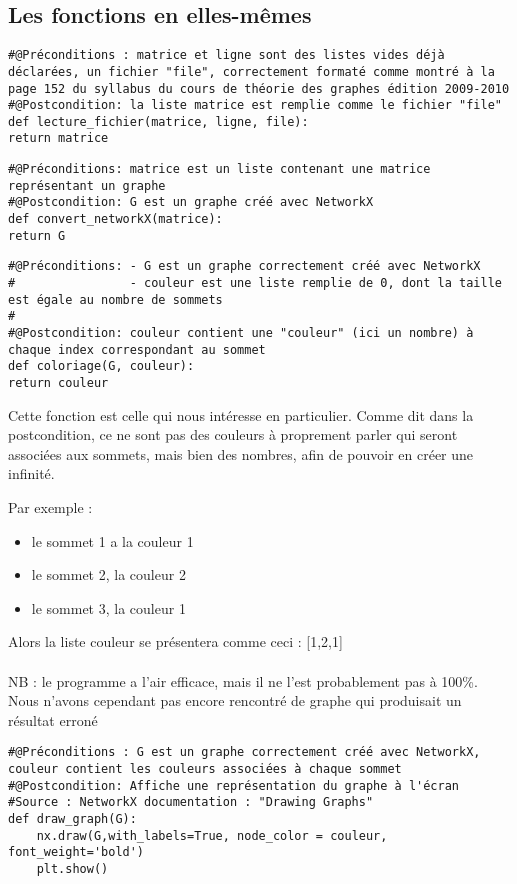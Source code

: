 \documentclass[a4paper, 11pt, oneside]{article}
\begin{document}
\subsection{Les fonctions en elles-mêmes}
\begin{lstlisting}[caption={lecture du fichier}]
#@Préconditions : matrice et ligne sont des listes vides déjà déclarées, un fichier "file", correctement formaté comme montré à la page 152 du syllabus du cours de théorie des graphes édition 2009-2010
#@Postcondition: la liste matrice est remplie comme le fichier "file"
def lecture_fichier(matrice, ligne, file):
return matrice
\end{lstlisting}

\begin{lstlisting}[caption={Convertir la matrice en graphe}]
#@Préconditions: matrice est un liste contenant une matrice représentant un graphe
#@Postcondition: G est un graphe créé avec NetworkX
def convert_networkX(matrice):
return G
\end{lstlisting}
\newpage




\begin{lstlisting}[caption={Coloriage des sommets}]
#@Préconditions: - G est un graphe correctement créé avec NetworkX
#                - couleur est une liste remplie de 0, dont la taille est égale au nombre de sommets
#
#@Postcondition: couleur contient une "couleur" (ici un nombre) à chaque index correspondant au sommet
def coloriage(G, couleur):
return couleur
\end{lstlisting}
Cette fonction est celle qui nous intéresse en particulier.
Comme dit dans la postcondition, ce ne sont pas des couleurs à proprement parler qui seront associées aux sommets, mais bien des nombres, afin de pouvoir en créer une infinité.

Par exemple : \begin{itemize}
              \item le sommet 1 a la couleur 1
              \item le sommet 2, la couleur 2
              \item le sommet 3, la couleur 1
              \end{itemize}
Alors la liste couleur se présentera comme ceci : [1,2,1]
\\
\\
NB : le programme a l'air efficace, mais il ne l'est probablement pas à 100\%. Nous n'avons cependant pas encore rencontré de graphe qui produisait un résultat erroné
\begin{lstlisting}[caption={Afficher le graphe à l'écran}]
#@Préconditions : G est un graphe correctement créé avec NetworkX, couleur contient les couleurs associées à chaque sommet
#@Postcondition: Affiche une représentation du graphe à l'écran
#Source : NetworkX documentation : "Drawing Graphs"
def draw_graph(G):
    nx.draw(G,with_labels=True, node_color = couleur, font_weight='bold')
    plt.show()
\end{lstlisting}
\end{document}
